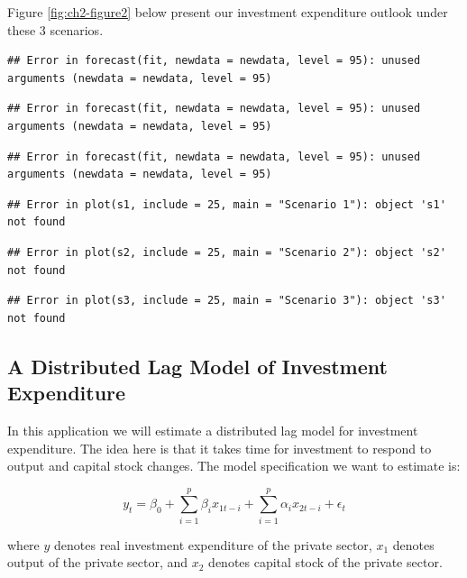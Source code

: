 \documentclass[]{book}
\theoremstyle{definition}
\theoremstyle{definition}
\theoremstyle{definition}
\theoremstyle{remark}
\begin{document}
Figure \ref{fig:ch2-figure2} below present our investment expenditure outlook under these 3 scenarios.

\begin{verbatim}
## Error in forecast(fit, newdata = newdata, level = 95): unused arguments (newdata = newdata, level = 95)
\end{verbatim}

\begin{verbatim}
## Error in forecast(fit, newdata = newdata, level = 95): unused arguments (newdata = newdata, level = 95)
\end{verbatim}

\begin{verbatim}
## Error in forecast(fit, newdata = newdata, level = 95): unused arguments (newdata = newdata, level = 95)
\end{verbatim}

\begin{verbatim}
## Error in plot(s1, include = 25, main = "Scenario 1"): object 's1' not found
\end{verbatim}

\begin{verbatim}
## Error in plot(s2, include = 25, main = "Scenario 2"): object 's2' not found
\end{verbatim}

\begin{verbatim}
## Error in plot(s3, include = 25, main = "Scenario 3"): object 's3' not found
\end{verbatim}

\hypertarget{a-distributed-lag-model-of-investment-expenditure}{%
\subsection{A Distributed Lag Model of Investment Expenditure}\label{a-distributed-lag-model-of-investment-expenditure}}

In this application we will estimate a distributed lag model for investment expenditure. The idea here is that it takes time for investment to respond to output and capital stock changes. The model specification we want to estimate is:

\begin{equation}
y_t= \beta_0 + \sum_{i=1}^p\beta_i x_{1t-i}+\sum_{i=1}^p\alpha_i x_{2t-i}+\epsilon_t
\end{equation}

where \(y\) denotes real investment expenditure of the private sector, \(x_1\) denotes output of the private sector, and \(x_2\) denotes capital stock of the private sector.
\end{document}
